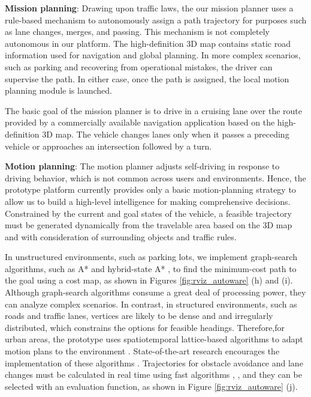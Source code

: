 \textbf{Mission planning}:
Drawing upon traffic laws, the our mission planner uses a rule-based mechanism to autonomously assign a path trajectory for purposes such as lane changes, merges, and passing.
This mechanism is not completely autonomous in our platform.
The high-definition 3D map contains static road information used for navigation and global planning.
In more complex scenarios, such as parking and recovering from operational mistakes, the driver can supervise the path.
In either case, once the path is assigned, the local motion planning module is launched.

The basic goal of the mission planner is to drive in a cruising lane over the route provided by a commercially available navigation application based on the high-definition 3D map.
The vehicle changes lanes only when it passes a preceding vehicle or approaches an intersection followed by a turn.

\textbf{Motion planning}:
The motion planner adjusts self-driving in response to driving behavior, which is not common across users and environments.
Hence, the prototype platform currently provides only a basic motion-planning strategy to allow us to build a high-level intelligence for making comprehensive decisions.
Constrained by the current and goal states of the vehicle, a feasible trajectory must be generated dynamically from the travelable area based on the 3D map and with consideration of surrounding objects and traffic rules.

In unstructured environments, such as parking lots, we implement graph-search algorithms, such as A* \cite{hart1968formal} and hybrid-state A* \cite{dolgov2010path}, to find the minimum-cost path to the goal using a cost map, as shown in Figures \ref{fig:rviz_autoware} (h) and (i).
Although graph-search algorithms consume a great deal of processing power, they can analyze complex scenarios.
In contrast, in structured environments, such as roads and traffic lanes, vertices are likely to be dense and and irregularly distributed, which constrains the options for feasible headings.
Therefore,for urban areas, the prototype uses spatiotemporal lattice-based algorithms to adapt motion plans to the environment \cite{mcnaughton2011motion}.
State-of-the-art research encourages the implementation of these algorithms \cite{urmson2008autonomous}.
Trajectories for obstacle avoidance and lane changes must be calculated in real time using fast algorithms \cite{pivtoraiko2009differentially}, \cite{mcnaughton2011motion}, and they can be selected with an evaluation function, as shown in Figure \ref{fig:rviz_autoware} (j).

